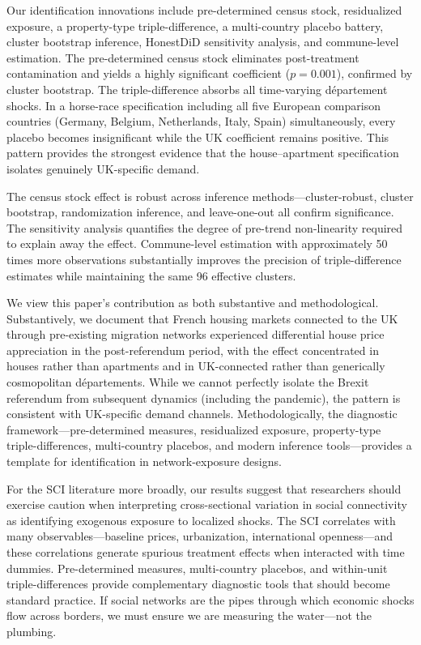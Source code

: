 \documentclass[12pt]{article}
\begin{document}
Our identification innovations include pre-determined census stock, residualized exposure, a property-type triple-difference, a multi-country placebo battery, cluster bootstrap inference, HonestDiD sensitivity analysis, and commune-level estimation. The pre-determined census stock eliminates post-treatment contamination and yields a highly significant coefficient ($p = 0.001$), confirmed by cluster bootstrap. The triple-difference absorbs all time-varying d\'epartement shocks. In a horse-race specification including all five European comparison countries (Germany, Belgium, Netherlands, Italy, Spain) simultaneously, every placebo becomes insignificant while the UK coefficient remains positive. This pattern provides the strongest evidence that the house--apartment specification isolates genuinely UK-specific demand.

The census stock effect is robust across inference methods---cluster-robust, cluster bootstrap, randomization inference, and leave-one-out all confirm significance. The \citet{rambachan2023more} sensitivity analysis quantifies the degree of pre-trend non-linearity required to explain away the effect. Commune-level estimation with approximately 50 times more observations substantially improves the precision of triple-difference estimates while maintaining the same 96 effective clusters.

We view this paper's contribution as both substantive and methodological. Substantively, we document that French housing markets connected to the UK through pre-existing migration networks experienced differential house price appreciation in the post-referendum period, with the effect concentrated in houses rather than apartments and in UK-connected rather than generically cosmopolitan d\'epartements. While we cannot perfectly isolate the Brexit referendum from subsequent dynamics (including the pandemic), the pattern is consistent with UK-specific demand channels. Methodologically, the diagnostic framework---pre-determined measures, residualized exposure, property-type triple-differences, multi-country placebos, and modern inference tools---provides a template for identification in network-exposure designs.

For the SCI literature more broadly, our results suggest that researchers should exercise caution when interpreting cross-sectional variation in social connectivity as identifying exogenous exposure to localized shocks. The SCI correlates with many observables---baseline prices, urbanization, international openness---and these correlations generate spurious treatment effects when interacted with time dummies. Pre-determined measures, multi-country placebos, and within-unit triple-differences provide complementary diagnostic tools that should become standard practice. If social networks are the pipes through which economic shocks flow across borders, we must ensure we are measuring the water---not the plumbing.
\end{document}
